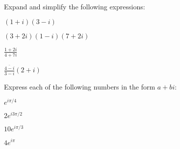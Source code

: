   \begin{problem}
  \item Expand and simplify the following expressions:
    \begin{subproblem}
      \item $(1+i)(3-i)$
        \vfill

      \item $(3+2i)(1-i)(7+2i)$
        \vfill

      \item $\frac{1+2i}{4+7i}$
        \vfill

      \item $\frac{\bar{4-i}}{3-i}(2+i)$
        \vfill

    \end{subproblem}

    \clearpage

  \item Express each of the following numbers in the form $a+bi$:
    \begin{subproblem}
    \item $e^{i\pi/4}$
      \vfill
    \item $2e^{i 3\pi/2}$
      \vfill
    \item $10e^{i \pi/3}$
      \vfill
    \item $4e^{i \pi}$
      \vfill
    \end{subproblem}


  \end{problem}


